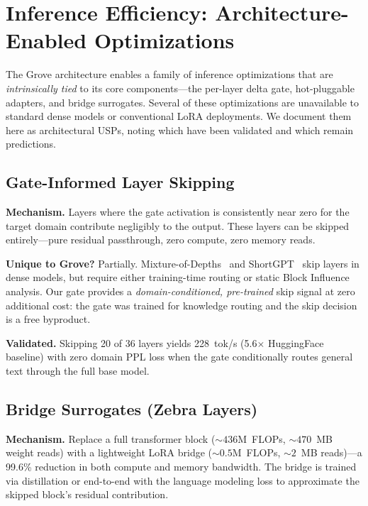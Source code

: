 \documentclass{article}
\begin{document}
\section{Inference Efficiency: Architecture-Enabled Optimizations}
\label{sec:appendix-performance}

The Grove architecture enables a family of inference optimizations that
are \emph{intrinsically tied} to its core components---the per-layer
delta gate, hot-pluggable adapters, and bridge surrogates. Several of
these optimizations are unavailable to standard dense models or
conventional LoRA deployments. We document them here as architectural
USPs, noting which have been validated and which remain predictions.

\subsection{Gate-Informed Layer Skipping}
\label{sec:perf-skip}

\textbf{Mechanism.} Layers where the gate activation is consistently
near zero for the target domain contribute negligibly to the output.
These layers can be skipped entirely---pure residual passthrough, zero
compute, zero memory reads.

\textbf{Unique to Grove?} Partially. Mixture-of-Depths~\cite{raposo2024mod}
and ShortGPT~\cite{men2024shortgpt} skip layers in dense models, but
require either training-time routing or static Block Influence analysis.
Our gate provides a \emph{domain-conditioned, pre-trained} skip signal
at zero additional cost: the gate was trained for knowledge routing and
the skip decision is a free byproduct.

\textbf{Validated.} Skipping 20 of 36 layers yields 228~tok/s (5.6$\times$
HuggingFace baseline) with zero domain PPL loss when the gate
conditionally routes general text through the full base model.

\subsection{Bridge Surrogates (Zebra Layers)}
\label{sec:perf-bridge}

\textbf{Mechanism.} Replace a full transformer block
(${\sim}436$M~FLOPs, ${\sim}470$~MB weight reads) with a lightweight
LoRA bridge (${\sim}0.5$M~FLOPs, ${\sim}2$~MB reads)---a 99.6\%
reduction in both compute and memory bandwidth. The bridge is trained
via distillation or end-to-end with the language modeling loss to
approximate the skipped block's residual contribution.
\end{document}
